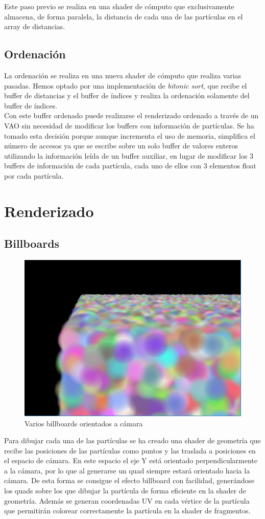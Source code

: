 \documentclass[10pt,oneside,a4paper]{article}
\begin{document}
Este paso previo se realiza en una shader de cómputo que exclusivamente almacena, de forma paralela, la distancia de cada una de las partículas en el array de distancias.

\subsection{Ordenación}
La ordenación se realiza en una nueva shader de cómputo que realiza varias pasadas. Hemos optado por una implementación de \textit{bitonic sort}, que recibe el buffer de distancias y el buffer de índices y realiza la ordenación solamente del buffer de índices.\\

Con este buffer ordenado puede realizarse el renderizado ordenado a través de un VAO sin necesidad de modificar los buffers con información de partículas. Se ha tomado esta decisión porque aunque incrementa el uso de memoria, simplifica el número de accesos ya que se escribe sobre un solo buffer de valores enteros utilizando la información leída de un buffer auxiliar, en lugar de modificar los 3 buffers de información de cada partícula, cada uno de ellos con 3 elementos float por cada partícula.

\section{Renderizado}
\subsection{Billboards}
\begin{figure}[h!tbp]
\centering
\includegraphics[width=.8\linewidth]{img/billboards.png}
\caption{Varios billboards orientados a cámara}
\end{figure}
Para dibujar cada una de las partículas se ha creado una shader de geometría que recibe las posiciones de las partículas como puntos y las traslada a posiciones en el espacio de cámara. En este espacio el eje Y está orientado perpendicularmente a la cámara, por lo que al generarse un quad siempre estará orientado hacia la cámara. De esta forma se consigue el efecto billboard con facilidad, generándose los quads sobre los que dibujar la partícula de forma eficiente en la shader de geometría. Además se generan coordenadas UV en cada vértice de la partícula que permitirán colorear correctamente la partícula en la shader de fragmentos.
\end{document}
